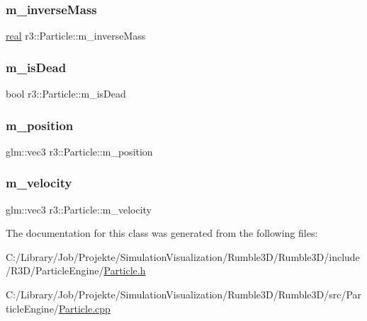 \subsubsection{\texorpdfstring{m\+\_\+inverse\+Mass}{m\_inverseMass}}
{\footnotesize\ttfamily \mbox{\hyperlink{namespacer3_ab2016b3e3f743fb735afce242f0dc1eb}{real}} r3\+::\+Particle\+::m\+\_\+inverse\+Mass\hspace{0.3cm}{\ttfamily [protected]}}

\mbox{\label{classr3_1_1_particle_a0a04ce870abc9017f09c2564344fda82}} 
\subsubsection{\texorpdfstring{m\+\_\+is\+Dead}{m\_isDead}}
{\footnotesize\ttfamily bool r3\+::\+Particle\+::m\+\_\+is\+Dead\hspace{0.3cm}{\ttfamily [protected]}}

\mbox{\label{classr3_1_1_particle_ab7f5aa7cf48278441aab18db1a0c1ba9}} 
\subsubsection{\texorpdfstring{m\+\_\+position}{m\_position}}
{\footnotesize\ttfamily glm\+::vec3 r3\+::\+Particle\+::m\+\_\+position\hspace{0.3cm}{\ttfamily [protected]}}

\mbox{\label{classr3_1_1_particle_a037d73e42df0c7bb9f1ae79b37301477}} 
\subsubsection{\texorpdfstring{m\+\_\+velocity}{m\_velocity}}
{\footnotesize\ttfamily glm\+::vec3 r3\+::\+Particle\+::m\+\_\+velocity\hspace{0.3cm}{\ttfamily [protected]}}



The documentation for this class was generated from the following files\+:\begin{DoxyCompactItemize}
\item 
C\+:/\+Library/\+Job/\+Projekte/\+Simulation\+Visualization/\+Rumble3\+D/\+Rumble3\+D/include/\+R3\+D/\+Particle\+Engine/\mbox{\hyperlink{_particle_8h}{Particle.\+h}}\item 
C\+:/\+Library/\+Job/\+Projekte/\+Simulation\+Visualization/\+Rumble3\+D/\+Rumble3\+D/src/\+Particle\+Engine/\mbox{\hyperlink{_particle_8cpp}{Particle.\+cpp}}\end{DoxyCompactItemize}
